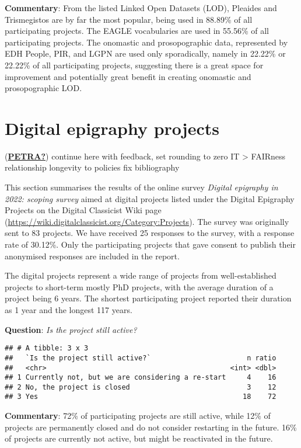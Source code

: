 \documentclass[
]{article}
\begin{document}
\textbf{Commentary}: From the listed Linked Open Datasets (LOD),
Pleaides and Trismegistos are by far the most popular, being used in
88.89\% of all participating projects. The EAGLE vocabularies are used
in 55.56\% of all participating projects. The onomastic and
prosopographic data, represented by EDH People, PIR, and LGPN are used
only sporadically, namely in 22.22\% or 22.22\% of all participating
projects, suggesting there is a great space for improvement and
potentially great benefit in creating onomastic and prosopographic LOD.

\hypertarget{digital-epigraphy-projects}{%
\section{Digital epigraphy projects}\label{digital-epigraphy-projects}}

(\protect\hyperlink{ref-PETRA}{\textbf{PETRA?}}) continue here with
feedback, set rounding to zero IT \textgreater{} FAIRness relationship
longevity to policies fix bibliography

This section summarises the results of the online survey \emph{Digital
epigraphy in 2022: scoping survey} aimed at digital projects listed
under the Digital Epigraphy Projects on the Digital Classicist Wiki page
(\url{https://wiki.digitalclassicist.org/Category:Projects}). The survey
was originally sent to 83 projects. We have received 25 responses to the
survey, with a response rate of 30.12\%. Only the participating projects
that gave consent to publish their anonymised responses are included in
the report.

The digital projects represent a wide range of projects from
well-established projects to short-term mostly PhD projects, with the
average duration of a project being 6 years. The shortest participating
project reported their duration as 1 year and the longest 117 years.

\textbf{Question}: \emph{Is the project still active?}

\begin{verbatim}
## # A tibble: 3 x 3
##   `Is the project still active?`                       n ratio
##   <chr>                                            <int> <dbl>
## 1 Currently not, but we are considering a re-start     4    16
## 2 No, the project is closed                            3    12
## 3 Yes                                                 18    72
\end{verbatim}

\textbf{Commentary}: 72\% of participating projects are still active,
while 12\% of projects are permanently closed and do not consider
restarting in the future. 16\% of projects are currently not active, but
might be reactivated in the future.
\end{document}

